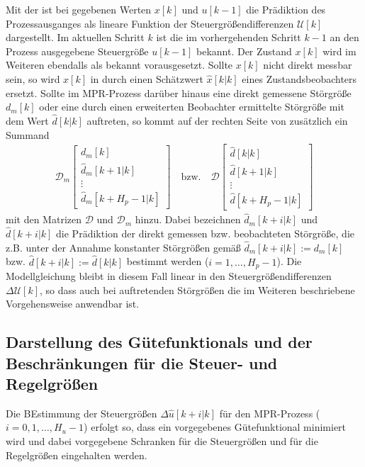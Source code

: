 Mit der  ist bei gegebenen Werten $x[k]$ und $u[k-1]$ die Prädiktion des Prozessausganges als lineare Funktion der
Steuergrößendifferenzen $\mathcal{U}[k]$ dargestellt. Im aktuellen Schritt $k$ ist die im vorhergehenden Schritt $k-1$ an den Prozess ausgegebene Steuergröße $u[k-1]$ bekannt. Der
Zustand $x[k]$ wird im Weiteren ebendalls als bekannt vorausgesetzt. Sollte $x[k]$ nicht direkt messbar sein, so wird $x[k]$ in  durch
einen Schätzwert $\hat{x}[k|k]$ eines Zustandsbeobachters ersetzt. Sollte im \ac{MPR}-Prozess  darüber hinaus eine direkt gemessene Störgröße
$d_m[k]$ oder eine durch einen erweiterten Beobachter ermittelte Störgröße mit dem Wert $\hat{d}[k|k]$ auftreten, so kommt auf der rechten Seite von
 zusätzlich ein Summand
\begin{align*}
	\mathcal{D}_m\begin{bmatrix}
	d_m[k]\\ \hat{d}_m[k+1|k]\\ \vdots \\ \hat{d}_m[k+H_p-1|k]
	\end{bmatrix}\quad\text{bzw.}\quad \mathcal{D}\begin{bmatrix}
	\hat{d}[k|k]\\ \hat{d}[k+1|k]\\ \vdots\\ \hat{d}[k+H_p-1|k]
	\end{bmatrix}
\end{align*}
mit den Matrizen $\mathcal{D}$ und $\mathcal{D}_m$ hinzu. Dabei bezeichnen $\hat{d}_m[k+i|k]$ und $\hat{d}[k+i|k]$ die Prädiktion der direkt gemessen bzw. beobachteten Störgröße, die
z.B. unter der Annahme konstanter Störgrößen gemäß $\hat{d}_m[k+i|k]:=d_m[k]$ bzw. $\hat{d}[k+i|k]:=\hat{d}[k|k]$ bestimmt werden ($i=1,\ldots,H_p-1$). Die Modellgleichung
 bleibt in diesem Fall linear in den Steuergrößendifferenzen $\Delta\mathcal{U}[k]$, so dass auch bei auftretenden Störgrößen die im
Weiteren beschriebene Vorgehensweise anwendbar ist.

\subsection{Darstellung des Gütefunktionals und der Beschränkungen für die Steuer- und Regelgrößen}
Die BEstimmung der Steuergrößen $\Delta\hat{u}[k+i|k]$ für den \ac{MPR}-Prozess ($i=0,1,\ldots,H_u-1$) erfolgt so, dass ein vorgegebenes Gütefunktional minimiert wird und dabei
vorgegebene Schranken für die Steuergrößen und für die Regelgrößen eingehalten werden.

